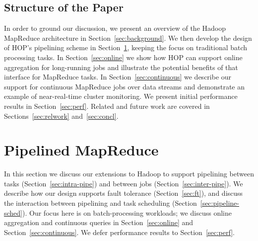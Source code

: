 \subsection{Structure of the Paper}
In order to ground our discussion, we present an overview of the Hadoop
MapReduce architecture in Section~\ref{sec:background}.  We then develop the
design of HOP's pipelining scheme in Section~\ref{sec:pipelining}, keeping the
focus on traditional batch processing tasks.  In Section~\ref{sec:online} we
show how HOP can support online aggregation for long-running jobs and illustrate
the potential benefits of that interface for MapReduce tasks.  In
Section~\ref{sec:continuous} we describe our support for continuous MapReduce
jobs over data streams and demonstrate an example of near-real-time cluster
monitoring.  We present initial performance results in
Section~\ref{sec:perf}. Related and future work are covered in
Sections~\ref{sec:relwork} and~\ref{sec:concl}.

\section{Pipelined MapReduce}
\label{sec:pipelining}

In this section we discuss our extensions to Hadoop to support pipelining
between tasks (Section~\ref{sec:intra-pipe}) and between jobs
(Section~\ref{sec:inter-pipe}).  We describe how our design supports fault
tolerance (Section~\ref{sec:ft}), and discuss the interaction between pipelining
and task scheduling (Section~\ref{sec:pipeline-sched}).  Our focus here is on
batch-processing workloads; we discuss online aggregation and continuous queries
in Section~\ref{sec:online} and Section~\ref{sec:continuous}. We defer
performance results to Section~\ref{sec:perf}.


